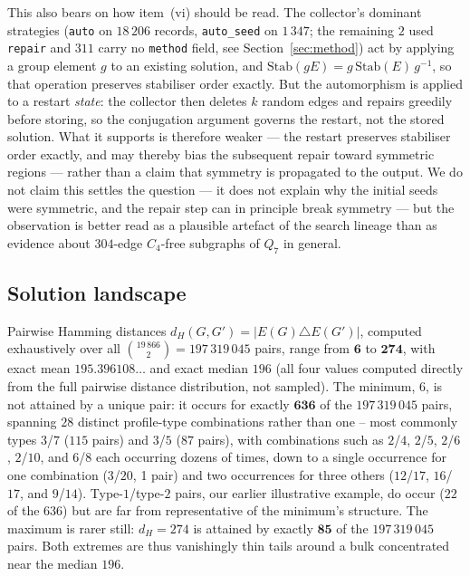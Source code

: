\documentclass[12pt]{article}
\begin{document}
This also bears on how item~(vi) should be read. The collector's dominant
strategies (\texttt{auto} on $18\,206$ records, \texttt{auto\_seed} on
$1\,347$; the remaining $2$ used \texttt{repair} and $311$ carry no
\texttt{method} field, see Section~\ref{sec:method}) act by applying a group
element $g$ to an existing solution, and
$\mathrm{Stab}(gE)=g\,\mathrm{Stab}(E)\,g^{-1}$, so that operation preserves
stabiliser order exactly. But the automorphism is applied to a restart \emph{state}: the collector then
deletes $k$ random edges and repairs greedily before storing, so the
conjugation argument governs the restart, not the stored solution. What it
supports is therefore weaker --- the restart preserves stabiliser order
exactly, and may thereby bias the subsequent repair toward symmetric regions
--- rather than a claim that symmetry is propagated to the output. We do not
claim this settles the question --- it does not explain why the initial seeds
were symmetric, and the repair step can in principle break symmetry --- but the
observation is better read as a plausible artefact of the search lineage than
as evidence about $304$-edge $C_4$-free subgraphs of $Q_7$ in general.

\subsection{Solution landscape}\label{sec:landscape}

Pairwise Hamming distances $d_H(G,G')=|E(G)\triangle E(G')|$, computed
exhaustively over all $\binom{19\,866}{2}=197\,319\,045$ pairs,
range from $\mathbf{6}$ to
$\mathbf{274}$, with exact mean $195.396108\ldots$ and exact median
$196$ (all four values computed directly from the full pairwise
distance distribution, not sampled). The minimum, $6$, is not
attained by a unique pair: it occurs for exactly $\mathbf{636}$ of the
$197\,319\,045$ pairs, spanning $28$ distinct profile-type
combinations rather than one -- most commonly types $3$/$7$ ($115$
pairs) and $3$/$5$ ($87$ pairs), with combinations such as $2$/$4$,
$2$/$5$, $2$/$6$, $2$/$10$, and $6$/$8$ each occurring dozens of
times, down to a single occurrence for one combination
($3$/$20$, 1 pair) and two occurrences for three others
($12$/$17$, $16$/$17$, and $9$/$14$). Type-$1$/type-$2$ pairs, our earlier illustrative
example, do occur ($22$ of the $636$) but are far from
representative of the minimum's structure. The maximum is rarer still:
$d_H=274$ is attained by exactly $\mathbf{85}$ of the
$197\,319\,045$ pairs. Both extremes are thus vanishingly thin tails
around a bulk concentrated near the median $196$.
\end{document}
